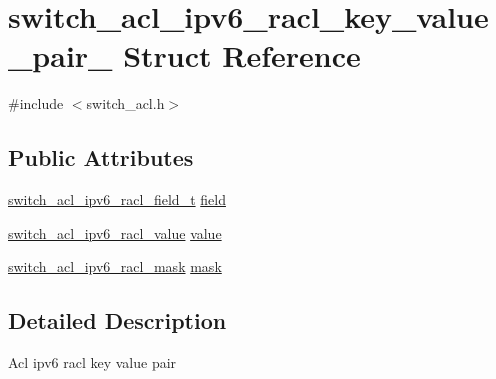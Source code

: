 \hypertarget{structswitch__acl__ipv6__racl__key__value__pair__}{\section{switch\+\_\+acl\+\_\+ipv6\+\_\+racl\+\_\+key\+\_\+value\+\_\+pair\+\_\+ Struct Reference}
\label{structswitch__acl__ipv6__racl__key__value__pair__}
}


{\ttfamily \#include $<$switch\+\_\+acl.\+h$>$}

\subsection*{Public Attributes}
\begin{DoxyCompactItemize}
\item 
\hyperlink{group__ACL_ga8b0c0741dee8773a26a38c9de04bce86}{switch\+\_\+acl\+\_\+ipv6\+\_\+racl\+\_\+field\+\_\+t} \hyperlink{structswitch__acl__ipv6__racl__key__value__pair___a4ed040e3b762954808f88cb8b00ae484}{field}
\item 
\hyperlink{group__ACL_gabd4501c34aa02ce20e75ca0adec4d446}{switch\+\_\+acl\+\_\+ipv6\+\_\+racl\+\_\+value} \hyperlink{structswitch__acl__ipv6__racl__key__value__pair___ab5645885e388c844892473c21116f261}{value}
\item 
\hyperlink{group__ACL_gaf31d1e6d533306d0c84eff01b351db3b}{switch\+\_\+acl\+\_\+ipv6\+\_\+racl\+\_\+mask} \hyperlink{structswitch__acl__ipv6__racl__key__value__pair___a3afff80a90086593bc17d4cba8111ee0}{mask}
\end{DoxyCompactItemize}


\subsection{Detailed Description}
Acl ipv6 racl key value pair 

